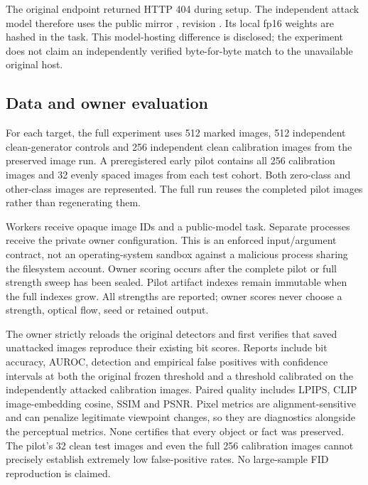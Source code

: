 The original \texttt{}
endpoint returned HTTP 404 during setup. The independent attack model
therefore uses the public mirror
\texttt{}, revision
\texttt{}. Its local
fp16 weights are hashed in the task. This model-hosting difference is
disclosed; the experiment does not claim an independently verified
byte-for-byte match to the unavailable original host.

\subsection{Data and owner
evaluation}\label{record-docs-closed-image-watermarking-md-data-and-owner-evaluation}

For each target, the full experiment uses 512 marked images, 512
independent clean-generator controls and 256 independent clean
calibration images from the preserved image run. A preregistered early
pilot contains all 256 calibration images and 32 evenly spaced images
from each test cohort. Both zero-class and other-class images are
represented. The full run reuses the completed pilot images rather than
regenerating them.

Workers receive opaque image IDs and a public-model task. Separate
processes receive the private owner configuration. This is an enforced
input/argument contract, not an operating-system sandbox against a
malicious process sharing the filesystem account. Owner scoring occurs
after the complete pilot or full strength sweep has been sealed. Pilot
artifact indexes remain immutable when the full indexes grow. All
strengths are reported; owner scores never choose a strength, optical
flow, seed or retained output.

The owner strictly reloads the original detectors and first verifies
that saved unattacked images reproduce their existing bit scores.
Reports include bit accuracy, AUROC, detection and empirical false
positives with confidence intervals at both the original frozen
threshold and a threshold calibrated on the independently attacked
calibration images. Paired quality includes LPIPS, CLIP image-embedding
cosine, SSIM and PSNR. Pixel metrics are alignment-sensitive and can
penalize legitimate viewpoint changes, so they are diagnostics alongside
the perceptual metrics. None certifies that every object or fact was
preserved. The pilot's 32 clean test images and even the full 256
calibration images cannot precisely establish extremely low
false-positive rates. No large-sample FID reproduction is claimed.

